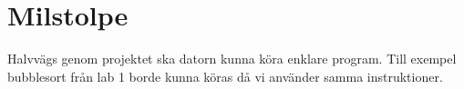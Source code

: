 \section{Milstolpe}
Halvvägs genom projektet ska datorn kunna köra enklare program. Till exempel bubblesort från lab 1 borde kunna köras då vi använder samma instruktioner.
